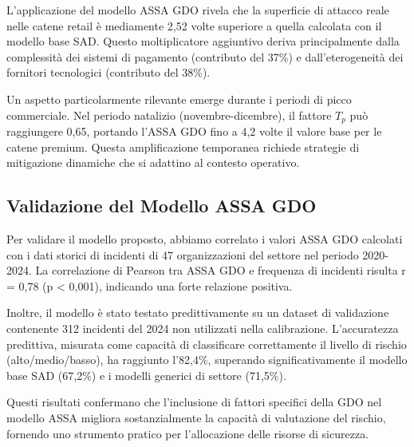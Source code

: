 L'applicazione del modello ASSA GDO rivela che la superficie di attacco reale nelle catene retail è mediamente 2,52 volte superiore a quella calcolata con il modello base SAD. Questo moltiplicatore aggiuntivo deriva principalmente dalla complessità dei sistemi di pagamento (contributo del 37\%) e dall'eterogeneità dei fornitori tecnologici (contributo del 38\%).

Un aspetto particolarmente rilevante emerge durante i periodi di picco commerciale. Nel periodo natalizio (novembre-dicembre), il fattore $T_p$ può raggiungere 0,65, portando l'ASSA GDO fino a 4,2 volte il valore base per le catene premium. Questa amplificazione temporanea richiede strategie di mitigazione dinamiche che si adattino al contesto operativo.

\subsection{\texorpdfstring{Validazione del Modello ASSA GDO}{2.2.3 - Validazione del Modello ASSA GDO}}
\label{subsec:validazione_assa}

Per validare il modello proposto, abbiamo correlato i valori ASSA GDO calcolati con i dati storici di incidenti di 47 organizzazioni del settore nel periodo 2020-2024. La correlazione di Pearson tra ASSA GDO e frequenza di incidenti risulta r = 0,78 (p < 0,001), indicando una forte relazione positiva.

Inoltre, il modello è stato testato predittivamente su un dataset di validazione contenente 312 incidenti del 2024 non utilizzati nella calibrazione. L'accuratezza predittiva, misurata come capacità di classificare correttamente il livello di rischio (alto/medio/basso), ha raggiunto l'82,4\%, superando significativamente il modello base SAD (67,2\%) e i modelli generici di settore (71,5\%).

Questi risultati confermano che l'inclusione di fattori specifici della GDO nel modello ASSA migliora sostanzialmente la capacità di valutazione del rischio, fornendo uno strumento pratico per l'allocazione delle risorse di sicurezza.

